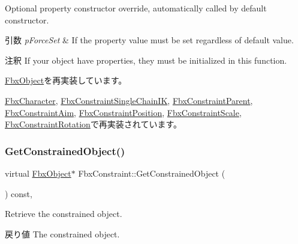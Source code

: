 Optional property constructor override, automatically called by default constructor. 
\begin{DoxyParams}{引数}
{\em p\+Force\+Set} & If the property value must be set regardless of default value. \\
\hline
\end{DoxyParams}
\begin{DoxyRemark}{注釈}
If your object have properties, they must be initialized in this function. 
\end{DoxyRemark}


\hyperlink{class_fbx_object_ad44f814323dc1b5e78bff1bfc608b4bb}{Fbx\+Object}を再実装しています。



\hyperlink{class_fbx_character_ae66db4ff3c527db3c47064c700ce179a}{Fbx\+Character}, \hyperlink{class_fbx_constraint_single_chain_i_k_aeffab44c49ad72283bdb07e50e9baf77}{Fbx\+Constraint\+Single\+Chain\+IK}, \hyperlink{class_fbx_constraint_parent_af968ae8a08629c4c259ec70ce2697c0e}{Fbx\+Constraint\+Parent}, \hyperlink{class_fbx_constraint_aim_a295c1f47dce7a051886dc6b9bb68025f}{Fbx\+Constraint\+Aim}, \hyperlink{class_fbx_constraint_position_adb2f3e784d01313ecc859b7cda16c182}{Fbx\+Constraint\+Position}, \hyperlink{class_fbx_constraint_scale_af34ea4ce8516d69aefbcb9e83060b2c1}{Fbx\+Constraint\+Scale}, \hyperlink{class_fbx_constraint_rotation_ad9f6469905777a18e3a383f402bdd9b0}{Fbx\+Constraint\+Rotation}で再実装されています。

\mbox{\label{class_fbx_constraint_a7f587d5db9685b5ee925a85354263edc}} 
\subsubsection{\texorpdfstring{Get\+Constrained\+Object()}{GetConstrainedObject()}}
{\footnotesize\ttfamily virtual \hyperlink{class_fbx_object}{Fbx\+Object}$\ast$ Fbx\+Constraint\+::\+Get\+Constrained\+Object (\begin{DoxyParamCaption}{ }\end{DoxyParamCaption}) const\hspace{0.3cm}{\ttfamily [inline]}, {\ttfamily [virtual]}}

Retrieve the constrained object. \begin{DoxyReturn}{戻り値}
The constrained object. 
\end{DoxyReturn}


